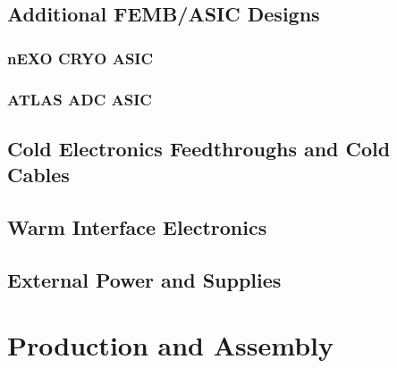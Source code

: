 \subsection{Additional FEMB/ASIC Designs}
\label{sec:fdsp-tpc-elec-design-alt}


\subsubsection{nEXO CRYO ASIC}
\label{sec:fdsp-tpc-elec-design-alt-cryo}


\subsubsection{ATLAS ADC ASIC}
\label{sec:fdsp-tpc-elec-design-alt-atlas}


\subsection{Cold Electronics Feedthroughs and Cold Cables}
\label{sec:fdsp-tpc-elec-design-ft}


\subsection{Warm Interface Electronics}
\label{sec:fdsp-tpc-elec-design-warm}


\subsection{External Power and Supplies}
\label{sec:fdsp-tpc-elec-design-external}



\section{Production and Assembly}
\label{sec:fdsp-tpc-elec-prod}



